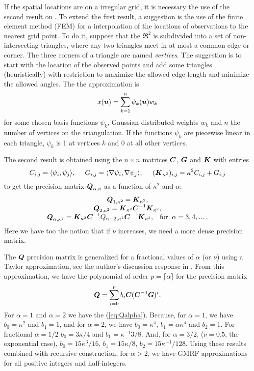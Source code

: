 If the spatial locations are on a irregular grid, 
it is necessary the use of the second result on
\cite{lindgrenRL:2011}. 
To extend the first result, a suggestion is the use of 
the finite element method (FEM) for a interpolation of 
the locations of observations to the nearest grid point. 
To do it, suppose that the $\Re^2$ is subdivided into 
a set of non-intersecting triangles, where any two
triangles meet in at most a common edge or corner. 
The three corners of a triangle are named \textit{vertices}.
The suggestion is to start with the location of the 
observed points and add some triangles (heuristically) 
with restriction to maximize the allowed edge length 
and minimize the allowed angles. 
The the approximation is 
\[x(\mbox{\protect \boldmath $u$}) = \sum_{k=1}^{n}\psi_k(\mbox{\protect \boldmath $u$})w_k\]
for some chosen basis functions {$\psi_k$}, 
Gaussian distributed weights $w_k$ and $n$ the 
number of vertices on the triangulation.
If the functions $\psi_k$ are piecewise linear in each 
triangle, $\psi_k$ is 1 at vertices $k$ and 0 at all 
other vertices. 

The second result is obtained using the $n\times n$ matrices 
$\mbox{\protect \boldmath $C$}$, $\mbox{\protect \boldmath $G$}$ and $\mbox{\protect \boldmath $K$}$ with entries 
\begin{equation}
C_{i,j} = \langle \psi_i, \psi_j\rangle, \;\;\;\;\;
G_{i,j} = \langle \nabla \psi_i, \nabla \psi_j \rangle, \;\;\;\;\;
(\mbox{\protect \boldmath $K$}_{\kappa^2})_{i,j} = \kappa^2 C_{i,j} + G_{i,j}
\end{equation}
to get the precision matrix $\mbox{\protect \boldmath $Q$}_{\alpha,\kappa}$ 
as a function of $\kappa^2$ and $\alpha$: 
\begin{equation}\label{eq:Qalpha}\begin{array}{c}
\mbox{\protect \boldmath $Q$}_{1,\kappa^2} = \mbox{\protect \boldmath $K$}_{\kappa^2}, \\
\mbox{\protect \boldmath $Q$}_{2,\kappa^2} = \mbox{\protect \boldmath $K$}_{\kappa^2}\mbox{\protect \boldmath $C$}^{-1}\mbox{\protect \boldmath $K$}_{\kappa^2}, \\
\mbox{\protect \boldmath $Q$}_{\alpha,\kappa^2} = \mbox{\protect \boldmath $K$}_{\kappa^2}\mbox{\protect \boldmath $C$}^{-1}Q_{\alpha-2,\kappa^2}\mbox{\protect \boldmath $C$}^{-1}\mbox{\protect \boldmath $K$}_{\kappa^2}, 
\;\;\;\mbox{for} \;\;\alpha = 3,4,...\;.
\end{array}\end{equation}
Here we have too the notion that if $\nu$ increases, 
we need a more dense precision matrix. 

The $\mbox{\protect \boldmath $Q$}$ precision matrix is generalized for a fractional values 
of $\alpha$ (or $\nu$) using a Taylor approximation, 
see the author's discussion response in \cite{lindgrenRL:2011}. 
From this approximation, we have the polynomial of 
order $p=\lceil \alpha \rceil$ for the precision matrix 
\begin{equation}
\mbox{\protect \boldmath $Q$} = \sum_{i=0}^p b_i \mbox{\protect \boldmath $C$}(\mbox{\protect \boldmath $C$}^{-1}\mbox{\protect \boldmath $G$})^i.
\end{equation}
For $\alpha=1$ and $\alpha=2$ we have the (\ref{eq:Qalpha}). 
Because, for $\alpha=1$, we have $b_0=\kappa^2$ and $b_1=1$, 
and for $\alpha=2$, we have $b_0=\kappa^4$, 
$b_1=\alpha\kappa^4$ and $b_2=1$. 
For fractional $\alpha=1/2$ 
$b_0=3\kappa/4$ and $b_1=\kappa^{-1}3/8$. 
And, for $\alpha=3/2$, ($\nu=0.5$, the exponential case), 
$b_0=15\kappa^3/16$, $b_1=15\kappa/8$, 
$b_2=15\kappa^{-1}/128$. 
Using these results combined with recursive construction, 
for $\alpha>2$, we have GMRF approximations for all positive 
integers and half-integers. 
